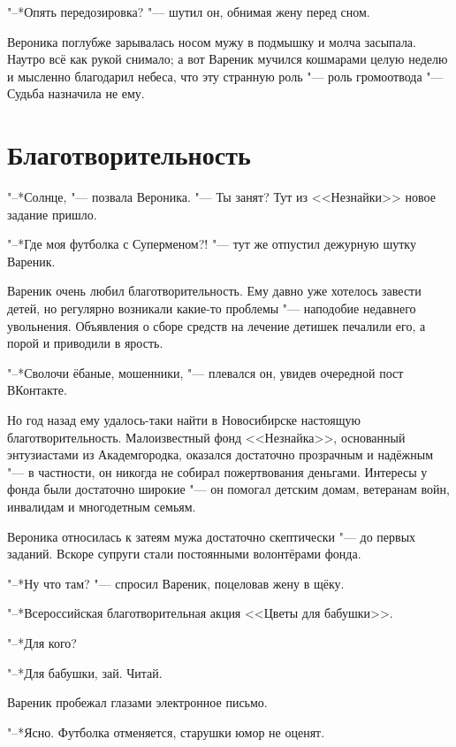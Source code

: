 "--*Опять передозировка? "--- шутил он, обнимая жену перед сном.

Вероника поглубже зарывалась носом мужу в подмышку и молча засыпала.
Наутро всё как рукой снимало;
а вот Вареник мучился кошмарами целую неделю и мысленно благодарил небеса, что эту странную роль "--- роль громоотвода "--- Судьба назначила не ему.

\section{\spacing}

\section{Благотворительность}

"--*Солнце, "--- позвала Вероника.
"--- Ты занят?
Тут из <<Незнайки>> новое задание пришло.

"--*Где моя футболка с Суперменом?! "--- тут же отпустил дежурную шутку Вареник.

Вареник очень любил благотворительность.
Ему давно уже хотелось завести детей, но регулярно возникали какие-то проблемы "--- наподобие недавнего увольнения.
Объявления о сборе средств на лечение детишек печалили его, а порой и приводили в ярость.

"--*Сволочи ёбаные, мошенники, "--- плевался он, увидев очередной пост ВКонтакте.

Но год назад ему удалось-таки найти в Новосибирске настоящую благотворительность.
Малоизвестный фонд <<Незнайка>>, основанный энтузиастами из Академгородка, оказался достаточно прозрачным и надёжным "--- в частности, он никогда не собирал пожертвования деньгами.
Интересы у фонда были достаточно широкие "--- он помогал детским домам, ветеранам войн, инвалидам и многодетным семьям.

Вероника относилась к затеям мужа достаточно скептически "--- до первых заданий.
Вскоре супруги стали постоянными волонтёрами фонда.

"--*Ну что там? "--- спросил Вареник, поцеловав жену в щёку.

"--*Всероссийская благотворительная акция <<Цветы для бабушки>>.

"--*Для кого?

"--*Для бабушки, зай.
Читай.

Вареник пробежал глазами электронное письмо.

"--*Ясно.
Футболка отменяется, старушки юмор не оценят.

